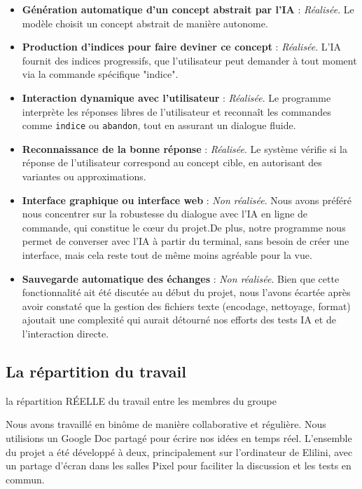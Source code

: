 \documentclass[a4paper, 12pt, twoside]{article}
\begin{document}
\begin{itemize}
\item \textbf{Génération automatique d’un concept abstrait par l’IA} : \textit{Réalisée}. Le modèle choisit un concept abstrait  de manière autonome.

\item \textbf{Production d’indices pour faire deviner ce concept} : \textit{Réalisée}. L’IA fournit des indices progressifs, que l’utilisateur peut demander à tout moment via la commande spécifique "indice".

\item \textbf{Interaction dynamique avec l’utilisateur} : \textit{Réalisée}. Le programme interprète les réponses libres de l’utilisateur et reconnaît les commandes comme \texttt{indice} ou \texttt{abandon}, tout en assurant un dialogue fluide.

\item \textbf{Reconnaissance de la bonne réponse} : \textit{Réalisée}. Le système vérifie si la réponse de l’utilisateur correspond au concept cible, en autorisant des variantes ou approximations.

\item \textbf{Interface graphique ou interface web} : \textit{Non réalisée}. Nous avons préféré nous concentrer sur la robustesse du dialogue avec l’IA en ligne de commande, qui constitue le cœur du projet.De plus, notre programme nous permet de converser avec l'IA à partir du terminal, sans besoin de créer une interface, mais cela reste tout de même moins agréable pour la vue. 

\item \textbf{Sauvegarde automatique des échanges} : \textit{Non réalisée}. Bien que cette fonctionnalité ait été discutée au début du projet, nous l’avons écartée après avoir constaté que la gestion des fichiers texte (encodage, nettoyage, format) ajoutait une complexité qui aurait détourné nos efforts des tests IA et de l’interaction directe.

\end{itemize}

\subsection{La répartition du travail}
la répartition RÉELLE du travail entre les membres du groupe

Nous avons travaillé en binôme de manière collaborative et régulière. Nous utilisions un Google Doc partagé pour écrire nos idées en temps réel. L’ensemble du projet a été développé à deux, principalement sur l’ordinateur de Elilini, avec un partage d’écran dans les salles Pixel pour faciliter la discussion et les tests en commun.
\end{document}
